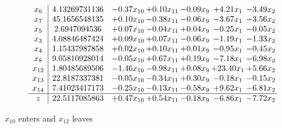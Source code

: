 \documentclass[9pt]{article}
\begin{document}
 \[\begin{array}{c| c c@{\hskip 2pt} c@{\hskip 2pt} c@{\hskip 2pt} c@{\hskip 2pt} c@{\hskip 2pt} }
 x_{6}   &  4.13269731136 & -0.37 x_{10} & +  0.10 x_{11} & -0.09 x_{9} & +  4.21 x_{1} & -3.49 x_{2}\\
 x_{7}   &  45.1656548135 & +  0.10 x_{10} & -0.38 x_{11} & -0.06 x_{9} & -3.67 x_{1} & -3.56 x_{2}\\
 x_{5}   &  2.6947094536 & +  0.07 x_{10} & -0.04 x_{11} & +  0.04 x_{9} & -0.25 x_{1} & -0.05 x_{2}\\
 x_{3}   &  4.08846487424 & +  0.09 x_{10} & +  0.07 x_{11} & -0.06 x_{9} & -1.19 x_{1} & -1.33 x_{2}\\
 x_{4}   &  1.15437987858 & +  0.02 x_{10} & +  0.10 x_{11} & +  0.01 x_{9} & -0.95 x_{1} & -0.45 x_{2}\\
 x_{8}   &  9.05810928014 & -0.05 x_{10} & +  0.67 x_{11} & +  0.19 x_{9} & -7.18 x_{1} & -6.98 x_{2}\\
 x_{12}   &  1.80485689506 & -1.46 x_{10} & -0.98 x_{11} & +  0.08 x_{9} & + 23.40 x_{1} & +  5.66 x_{2}\\
 x_{13}   &  22.8187337381 & -0.05 x_{10} & -0.34 x_{11} & +  0.30 x_{9} & -0.18 x_{1} & -0.15 x_{2}\\
 x_{14}   &  7.41023417173 & -0.25 x_{10} & -0.13 x_{11} & -0.58 x_{9} & +  9.62 x_{1} & -6.81 x_{2}\\
\hline
z    &  22.5117085863 & +  0.47 x_{10} & +  0.54 x_{11} & -0.18 x_{9} & -6.86 x_{1} & -7.72 x_{2}\\
\end{array}\]


 $ x_{10} $ enters and $ x_{12} $ leaves 
\end{document}
